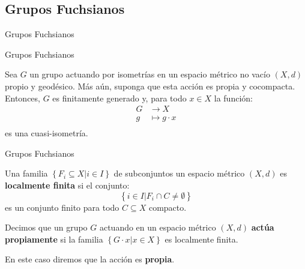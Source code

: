 \documentclass[xcolor=dvipsnames]{beamer}
\theoremstyle{largebreak}
\begin{document}

\subsection{Grupos Fuchsianos}

\begin{frame}
    \begin{center}
        \Large Grupos Fuchsianos
    \end{center}
\end{frame}

\begin{frame}{Grupos Fuchsianos}
    \begin{cor}
        Sea $G$ un grupo actuando por isometrías en un espacio métrico no vacío $(X,d)$ propio y geodésico. Más aún, suponga que esta acción es propia y cocompacta. Entonces, $G$ es finitamente generado y, para todo $x\in X$ la función:
        \begin{equation*}
            \begin{split}
                G&\rightarrow X\\
                g&\mapsto g\cdot x\\
            \end{split}
        \end{equation*}
        es una cuasi-isometría.
    \end{cor}
\end{frame}

\begin{frame}{Grupos Fuchsianos}
    \begin{mydef}
        Una familia $\left\{F_i\subseteq X\Big|i\in I \right\}$ de subconjuntos un espacio métrico $(X,d)$ es \textbf{localmente finita} si el conjunto:
        \begin{equation*}
            \left\{i\in I \Big|F_i\cap C\neq\emptyset \right\}
        \end{equation*}
        es un conjunto finito para todo $C\subseteq X$ compacto.
    \end{mydef}

    \begin{mydef}
        Decimos que un grupo $G$ actuando en un espacio métrico $(X,d)$ \textbf{actúa propiamente} si la familia $\left\{G\cdot x\Big|x\in X \right\}$ es localmente finita.

        En este caso diremos que la acción es \textbf{propia}.
    \end{mydef}
\end{frame}
\end{document}

